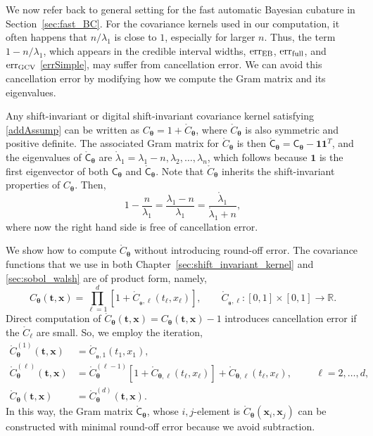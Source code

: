 \documentclass{iitthesis}          %
\newcommand{\bm}[1]{\boldsymbol{#1}}
\newcommand{\reals}{\mathbb{R}}
\newcommand{\rC}{\mathring{C}}
\newcommand{\rlambda}{\mathring{\lambda}}
\newcommand{\vtheta}{{\bm{\theta}}}
\newcommand{\vt}{\bm{t}}
\newcommand{\vx}{\bm{x}}
\newcommand{\vone}{\bm{1}}
\newcommand{\mC}{\mathsf{C}}
\newcommand{\rmC}{\mathring{\mathsf{C}}}
\newcommand{\MLE}{\textup{EB}}
\newcommand{\err}{\textup{err}}
\begin{document}
\clearpage







\label{sec:NumImpl}

\label{sec:overcome_cancel_error}

We now refer back to general setting for the fast automatic Bayesian cubature in Section~\ref{sec:fast_BC}.
For the covariance kernels used in our computation, it often happens that $n/\lambda_1$ is close to $1$, especially for larger $n$.  Thus, the term $1-n/\lambda_1$, which appears in the credible interval widths, $\err_{\MLE}$, $\err_{\textup{full}}$, and $\err_{\textup{GCV}}$  \eqref{errSimple}, may suffer from cancellation error.  We can avoid this cancellation error by modifying how we compute the Gram matrix and its eigenvalues.

Any shift-invariant or digital shift-invariant covariance kernel satisfying \eqref{addAssump} can be written as $C_\vtheta = 1 + \rC_\vtheta$, where $\rC_\vtheta$ is also symmetric and positive definite.
The associated Gram matrix for $\rC_\vtheta$ is then $\rmC_\vtheta = \mC_\vtheta - \vone \vone^T$, and the eigenvalues of $\rmC_\vtheta$ are $\rlambda_1 = \lambda_1 - n, \lambda_2, \ldots, \lambda_n$, which follows because $\vone$ is the first eigenvector of both $\mC_\vtheta$ and $\rmC_\vtheta$. Note that $\rC_\vtheta$ inherits the shift-invariant properties of $C_\vtheta$. Then,
\begin{equation*}
1 - \frac{n}{\lambda_1}  = \frac{\lambda_1 - n}{\lambda_1} = \frac{\rlambda_1}{\rlambda_1 +n},
\end{equation*}
where now the right hand side is free of cancellation error.

We show how to compute $\rC_\vtheta$ without introducing round-off error.  The covariance functions that we use in both Chapter~\ref{sec:shift_invariant_kernel} and \ref{sec:sobol_walsh} are of product form, namely,
\begin{equation*}
C_\vtheta(\vt, \vx) = \prod_{\ell=1}^d \left[1 + \rC_{_\vtheta,\ell}(t_\ell,x_\ell) \right], \qquad  \rC_{_\vtheta,\ell}:[0,1] \times [0,1] \to \reals.
\end{equation*}
Direct computation of $\rC_\vtheta (\vt,\vx) = C_\vtheta(\vt,\vx) -1$ introduces cancellation error if the $ \rC_\ell$ are small.  So, we employ the iteration,
\begin{align*}
\rC_\vtheta^{(1)}(\vt,\vx) &= \rC_{_\vtheta,1}(t_1,x_1),  \\
\rC_\vtheta^{(\ell)}(\vt,\vx) &  = \rC_\vtheta^{(\ell-1)}[1 + \rC_{\vtheta,\ell}(t_\ell,x_\ell)] + \rC_{\vtheta,\ell}(t_\ell,x_\ell),  \hspace{1cm} \ell = 2, \ldots, d, \\
\rC_\vtheta(\vt,\vx)  & = \rC_\vtheta^{(d)}(\vt,\vx).
\end{align*}
In this way, the Gram matrix $\rmC_\vtheta$, whose $i,j$-element is $\rC_\vtheta(\vx_i,\vx_j)$ can be constructed with minimal round-off error because we avoid subtraction.
\end{document}
